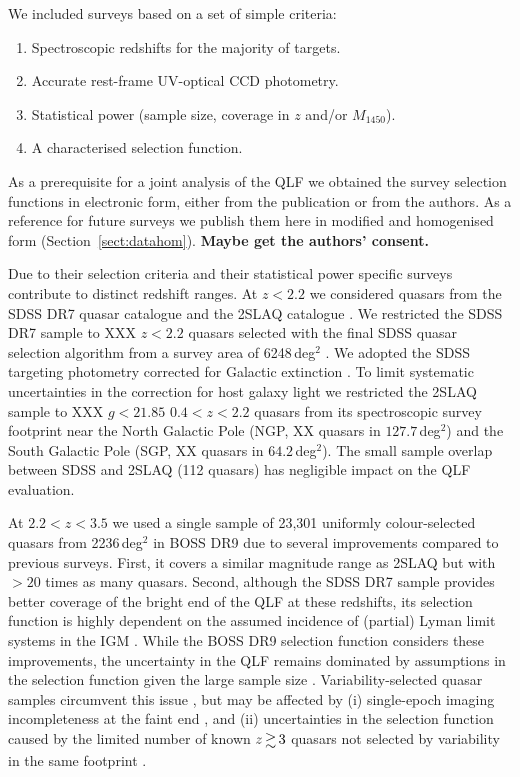 \documentclass[a4paper,fleqn,usenatbib]{mnras}
\begin{document}
We included surveys based on a set of simple criteria:
\begin{enumerate}
\item Spectroscopic redshifts for the majority of targets.
\item Accurate rest-frame UV-optical CCD photometry.
\item Statistical power (sample size, coverage in $z$ and/or $M_{1450}$).
\item A characterised selection function.
\end{enumerate}
As a prerequisite for a joint analysis of the QLF we obtained the
survey selection functions in electronic form, either from the
publication or from the authors. As a reference for future surveys we
publish them here in modified and homogenised form
(Section~\ref{sect:datahom}). \textbf{Maybe get the authors' consent.}

Due to their selection criteria and their statistical power specific
surveys contribute to distinct redshift ranges. At $z<2.2$ we
considered quasars from the SDSS DR7 quasar catalogue
\citep{2010AJ....139.2360S} and the 2SLAQ catalogue
\citep{2009MNRAS.392...19C}. We restricted the SDSS DR7 sample to XXX
$z<2.2$ quasars selected with the final SDSS quasar selection
algorithm \citep{2002AJ....123.2945R, 2006AJ....131.2766R} from a
survey area of 6248\,deg$^2$ \citep{2012ApJ...746..169S}. We adopted
the SDSS targeting photometry corrected for Galactic extinction
\citep{2010AJ....139.2360S}. To limit systematic uncertainties in the
correction for host galaxy light \citep{2009MNRAS.392...19C} we
restricted the 2SLAQ sample to XXX $g<21.85$ $0.4<z<2.2$ quasars from
its spectroscopic survey footprint near the North Galactic Pole (NGP,
XX quasars in $127.7$\,deg$^2$) and the South Galactic Pole (SGP, XX
quasars in $64.2$\,deg$^2$). The small sample overlap between SDSS and
2SLAQ (112 quasars) has negligible impact on the QLF evaluation.

At $2.2<z<3.5$ we used a single sample of 23,301 uniformly
colour-selected quasars from 2236\,deg$^2$ in BOSS DR9
\citep{2013ApJ...773...14R} due to several improvements compared to
previous surveys. First, it covers a similar magnitude range as 2SLAQ
but with $>20$ times as many quasars. Second, although the SDSS DR7
sample provides better coverage of the bright end of the QLF at these
redshifts, its selection function is highly dependent on the assumed
incidence of (partial) Lyman limit systems in the IGM
\citep{2009ApJ...705L.113P, 2011ApJ...728...23W}. While the BOSS DR9
selection function considers these improvements, the uncertainty in
the QLF remains dominated by assumptions in the selection function
given the large sample size
\citep{2013ApJ...773...14R}. Variability-selected quasar samples
circumvent this issue \citep{2013ApJ...773...14R, 2013A&A...551A..29P,
  2016A&A...587A..41P}, but may be affected by (i) single-epoch
imaging incompleteness at the faint end \citep{2013ApJ...773...14R},
and (ii) uncertainties in the selection function caused by the limited
number of known $z\ga 3$ quasars not selected by variability in the
same footprint \citep{2013A&A...551A..29P, 2016A&A...587A..41P}.
\end{document}
